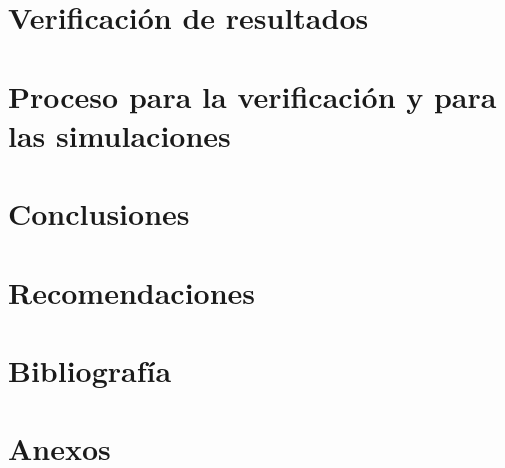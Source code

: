 \section{Verificación de resultados}
\section{Proceso para la verificación y para las simulaciones}
\section{Conclusiones}
\section{Recomendaciones}
\section{Bibliografía}
\section{Anexos}



